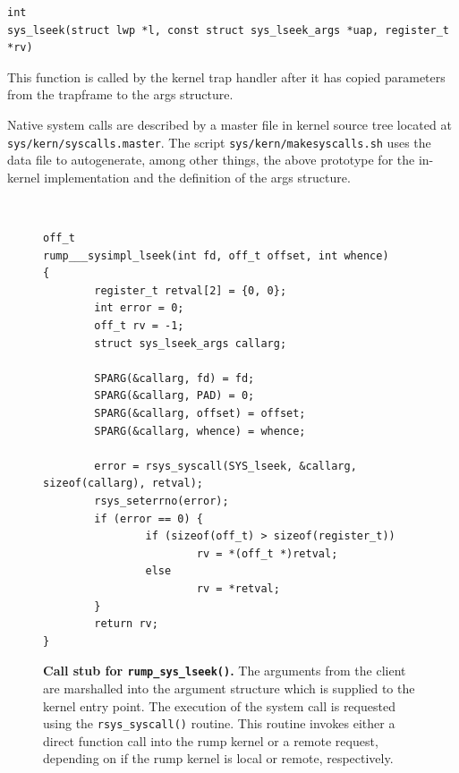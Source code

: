 {\small
\begin{verbatim}
int
sys_lseek(struct lwp *l, const struct sys_lseek_args *uap, register_t *rv)
\end{verbatim}}

This function is called by the kernel trap handler after it has copied
parameters from the trapframe to the args structure.

Native system calls are described by a master file in kernel source
tree located at \texttt{sys/kern/syscalls.master}.  The script
\texttt{sys/kern/makesyscalls.sh} uses the data file to autogenerate,
among other things, the above prototype for the in-kernel implementation
and the definition of the args structure.

\begin{figure}[t]
{\tt \scriptsize  
\begin{verbatim}
off_t
rump___sysimpl_lseek(int fd, off_t offset, int whence)
{
        register_t retval[2] = {0, 0};
        int error = 0;
        off_t rv = -1;
        struct sys_lseek_args callarg;

        SPARG(&callarg, fd) = fd;
        SPARG(&callarg, PAD) = 0;
        SPARG(&callarg, offset) = offset;
        SPARG(&callarg, whence) = whence;

        error = rsys_syscall(SYS_lseek, &callarg, sizeof(callarg), retval);
        rsys_seterrno(error);
        if (error == 0) {
                if (sizeof(off_t) > sizeof(register_t))
                        rv = *(off_t *)retval;
                else
                        rv = *retval;
        }
        return rv;
}
\end{verbatim}}
\caption[Call stub for \texttt{rump\_sys\_lseek()}]{
\textbf{Call stub for \texttt{rump\_sys\_lseek()}.}
The arguments from the client are marshalled into the argument structure
which is supplied to the kernel entry point.  The execution of the system
call is requested using the \texttt{rsys\_syscall()} routine.  This routine
invokes either a direct function call into the rump kernel or a remote request,
depending on if the rump kernel is local or remote, respectively.
}
\label{fig:rumpsyslseek}
\end{figure}

